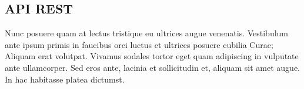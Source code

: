 \subsection{API REST}

Nunc posuere quam at lectus tristique eu ultrices augue venenatis. Vestibulum ante ipsum primis in faucibus orci luctus et ultrices posuere cubilia Curae; Aliquam erat volutpat. Vivamus sodales tortor eget quam adipiscing in vulputate ante ullamcorper. Sed eros ante, lacinia et sollicitudin et, aliquam sit amet augue. In hac habitasse platea dictumst.
